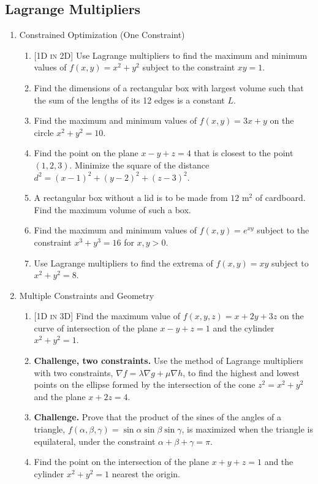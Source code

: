 \documentclass[12pt]{article}
\newcommand{\dimtag}[1]{{\footnotesize\textsc{[#1]}}\;}
\newcounter{topic}
\begin{document}
\subsection*{Lagrange Multipliers}
\begin{enumerate}\setcounter{enumi}{\value{topic}}

\item Constrained Optimization (One Constraint)
    \begin{enumerate}
        \item \dimtag{1D in 2D} Use Lagrange multipliers to find the maximum and minimum values of $f(x,y) = x^2 + y^2$ subject to the constraint $xy = 1$.
        \item Find the dimensions of a rectangular box with largest volume such that the sum of the lengths of its 12 edges is a constant $L$.
        \item Find the maximum and minimum values of $f(x,y) = 3x + y$ on the circle $x^2 + y^2 = 10$.
        \item Find the point on the plane $x - y + z = 4$ that is closest to the point $(1, 2, 3)$. Minimize the square of the distance $d^2 = (x-1)^2 + (y-2)^2 + (z-3)^2$.
        \item A rectangular box without a lid is to be made from $12 \text{ m}^2$ of cardboard. Find the maximum volume of such a box.
        \item Find the maximum and minimum values of $f(x,y) = e^{xy}$ subject to the constraint $x^3 + y^3 = 16$ for $x,y > 0$.
        \item Use Lagrange multipliers to find the extrema of $f(x,y)=xy$ subject to $x^2+y^2=8$.
    \end{enumerate}
\bigskip

\item Multiple Constraints and Geometry
    \begin{enumerate}
        \item \dimtag{1D in 3D} Find the maximum value of $f(x,y,z) = x + 2y + 3z$ on the curve of intersection of the plane $x - y + z = 1$ and the cylinder $x^2 + y^2 = 1$.
        \item \textbf{Challenge, two constraints.} Use the method of Lagrange multipliers with two constraints, $\nabla f = \lambda \nabla g + \mu \nabla h$, to find the highest and lowest points on the ellipse formed by the intersection of the cone $z^2 = x^2 + y^2$ and the plane $x + 2z = 4$.
        \item \textbf{Challenge.} Prove that the product of the sines of the angles of a triangle, $f(\alpha, \beta, \gamma) = \sin \alpha \sin \beta \sin \gamma$, is maximized when the triangle is equilateral, under the constraint $\alpha + \beta + \gamma = \pi$.
        \item Find the point on the intersection of the plane $x+y+z=1$ and the cylinder $x^2+y^2=1$ nearest the origin.
    \end{enumerate}
\newpage
\setcounter{topic}{\value{enumi}}
\end{enumerate}
\end{document}
